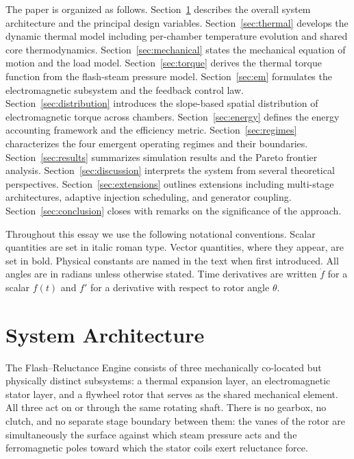 \documentclass[11pt, a4paper]{article}
\theoremstyle{plain}
\theoremstyle{definition}
\begin{document}
The paper is organized as follows. Section~\ref{sec:architecture} describes the overall system architecture and the principal design variables. Section~\ref{sec:thermal} develops the dynamic thermal model including per-chamber temperature evolution and shared core thermodynamics. Section~\ref{sec:mechanical} states the mechanical equation of motion and the load model. Section~\ref{sec:torque} derives the thermal torque function from the flash-steam pressure model. Section~\ref{sec:em} formulates the electromagnetic subsystem and the feedback control law. Section~\ref{sec:distribution} introduces the slope-based spatial distribution of electromagnetic torque across chambers. Section~\ref{sec:energy} defines the energy accounting framework and the efficiency metric. Section~\ref{sec:regimes} characterizes the four emergent operating regimes and their boundaries. Section~\ref{sec:results} summarizes simulation results and the Pareto frontier analysis. Section~\ref{sec:discussion} interprets the system from several theoretical perspectives. Section~\ref{sec:extensions} outlines extensions including multi-stage architectures, adaptive injection scheduling, and generator coupling. Section~\ref{sec:conclusion} closes with remarks on the significance of the approach.

Throughout this essay we use the following notational conventions. Scalar quantities are set in italic roman type. Vector quantities, where they appear, are set in bold. Physical constants are named in the text when first introduced. All angles are in radians unless otherwise stated. Time derivatives are written $\dot{f}$ for a scalar $f(t)$ and $f'$ for a derivative with respect to rotor angle $\theta$.

\section{System Architecture}
\label{sec:architecture}

The Flash--Reluctance Engine consists of three mechanically co-located but physically distinct subsystems: a thermal expansion layer, an electromagnetic stator layer, and a flywheel rotor that serves as the shared mechanical element. All three act on or through the same rotating shaft. There is no gearbox, no clutch, and no separate stage boundary between them: the vanes of the rotor are simultaneously the surface against which steam pressure acts and the ferromagnetic poles toward which the stator coils exert reluctance force.
\end{document}
